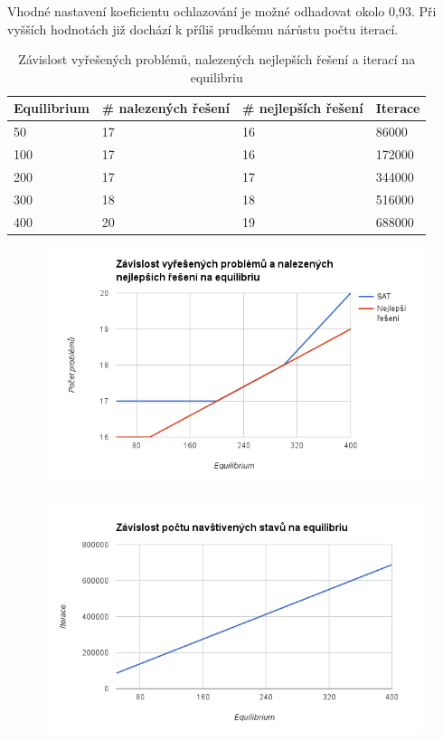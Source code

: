 \documentclass[10pt,a4paper]{article}
\begin{document}
Vhodné nastavení koeficientu ochlazování je možné odhadovat okolo 0,93. Při vyšších hodnotách již dochází k příliš prudkému nárůstu počtu iterací.

\begin{table}[H]
\centering
  \begin{tabular}{ |l|l|l|l|}
  \hline
  Equilibrium & \# nalezených řešení & \# nejlepších řešení & Iterace\\
  \hline
    50  & 17 & 16 & 86000  \\
    100 & 17 & 16 & 172000 \\
    200 & 17 & 17 & 344000 \\
    300 & 18 & 18 & 516000 \\
    400 & 20 & 19 & 688000 \\
  \hline
  \end{tabular}
  \caption{Závislost vyřešených problémů, nalezených nejlepších řešení a iterací na equilibriu}
\end{table}

\begin{figure}[H]\centering
 \includegraphics[width=0.99\textwidth]{6}
\end{figure}

\begin{figure}[H]\centering
 \includegraphics[width=0.99\textwidth]{7}
\end{figure}
\end{document}
